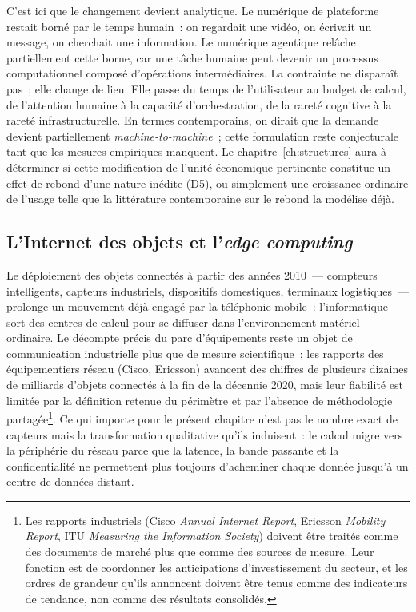 %
C'est ici que le changement devient analytique. Le numérique de plateforme restait borné par le temps humain~: on regardait une vidéo, on écrivait un message, on cherchait une information. Le numérique agentique relâche partiellement cette borne, car une tâche humaine peut devenir un processus computationnel composé d'opérations intermédiaires. La contrainte ne disparaît pas~; elle change de lieu. Elle passe du temps de l'utilisateur au budget de calcul, de l'attention humaine à la capacité d'orchestration, de la rareté cognitive à la rareté infrastructurelle. En termes contemporains, on dirait que la demande devient partiellement \emph{machine-to-machine}~; cette formulation reste conjecturale tant que les mesures empiriques manquent. Le chapitre~\ref{ch:structures} aura à déterminer si cette modification de l'unité économique pertinente constitue un effet de rebond d'une nature inédite (D5), ou simplement une croissance ordinaire de l'usage telle que la littérature contemporaine sur le rebond la modélise déjà.


\subsection{L'Internet des objets et l'\emph{edge computing}}\label{subsec:iot}

%
Le déploiement des objets connectés à partir des années 2010~--- compteurs intelligents, capteurs industriels, dispositifs domestiques, terminaux logistiques~--- prolonge un mouvement déjà engagé par la téléphonie mobile~: l'informatique sort des centres de calcul pour se diffuser dans l'environnement matériel ordinaire. Le décompte précis du parc d'équipements reste un objet de communication industrielle plus que de mesure scientifique~; les rapports des équipementiers réseau (Cisco, Ericsson) avancent des chiffres de plusieurs dizaines de milliards d'objets connectés à la fin de la décennie 2020, mais leur fiabilité est limitée par la définition retenue du périmètre et par l'absence de méthodologie partagée\footnote{Les rapports industriels (Cisco \emph{Annual Internet Report}, Ericsson \emph{Mobility Report}, ITU \emph{Measuring the Information Society}) doivent être traités comme des documents de marché plus que comme des sources de mesure. Leur fonction est de coordonner les anticipations d'investissement du secteur, et les ordres de grandeur qu'ils annoncent doivent être tenus comme des indicateurs de tendance, non comme des résultats consolidés.}. Ce qui importe pour le présent chapitre n'est pas le nombre exact de capteurs mais la transformation qualitative qu'ils induisent~: le calcul migre vers la périphérie du réseau parce que la latence, la bande passante et la confidentialité ne permettent plus toujours d'acheminer chaque donnée jusqu'à un centre de données distant.

